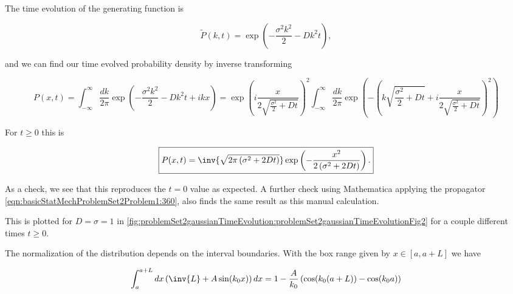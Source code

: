 {The time evolution of the generating function is

\begin{dmath}\label{eqn:basicStatMechProblemSet2Problem1:300}
\tilde{P}(k, t) 
= 
\exp\left(
-\frac{\sigma^2 k^2}{2} - D k^2 t
\right),
\end{dmath}

and we can find our time evolved probability density by inverse transforming

\begin{dmath}\label{eqn:basicStatMechProblemSet2Problem1:320}
P(x, t) 
= 
\int_{-\infty}^\infty \frac{dk}{2 \pi} 
\exp\left(
-\frac{\sigma^2 k^2}{2} - D k^2 t + i k x
\right)
=
\exp\left(
i \frac{x}{ 2 \sqrt{\frac{\sigma^2}{2} + D t} }
\right)^2
\int_{-\infty}^\infty \frac{dk}{2 \pi} 
\exp\left(
-\left(
k \sqrt{\frac{\sigma^2}{2} + D t} 
+ i \frac{x}{ 2 
\sqrt{\frac{\sigma^2}{2} + D t} 
}
\right)^2
\right)
\end{dmath}

For $t \ge 0$ this is

\begin{equation}\label{eqn:basicStatMechProblemSet2Problem1:340}
\boxed{
P(x, t) 
=
\inv{\sqrt{2 \pi \left( \sigma^2 + 2 D t \right) } }
\exp\left(
-\frac{x^2}{2 \left( \sigma^2 + 2 D t \right) }
\right).
}
\end{equation}

As a check, we see that this reproduces the $t = 0$ value as expected.  A further check using Mathematica applying the propagator \ref{eqn:basicStatMechProblemSet2Problem1:360}, also finds the same result as this manual calculation.

This is plotted for $D = \sigma = 1$ in \cref{fig:problemSet2gaussianTimeEvolution:problemSet2gaussianTimeEvolutionFig2} for a couple different times $t \ge 0$.



The normalization of the distribution depends on the interval boundaries.  With the box range given by $x \in [a, a + L]$ we have

\begin{equation}\label{eqn:basicStatMechProblemSet2Problem1:380}
\int_a^{a + L} dx \left( \inv{L} + A \sin( k_0 x) \right) dx
=
1 - \frac{A}{k_0} \left( \cos( k_0(a + L) ) - \cos( k_0 a ) \right)
\end{equation}

}
